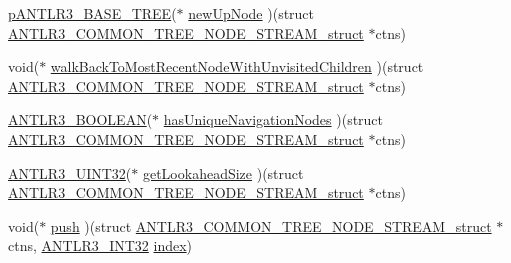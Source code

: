 \begin{DoxyCompactItemize}
\item 
\hyperlink{antlr3interfaces_8h_a6313a8a3e8f044398a393bd10c083852}{p\-A\-N\-T\-L\-R3\-\_\-\-B\-A\-S\-E\-\_\-\-T\-R\-E\-E}($\ast$ \hyperlink{struct_a_n_t_l_r3___c_o_m_m_o_n___t_r_e_e___n_o_d_e___s_t_r_e_a_m__struct_adf1b9363e749efdaca9c3548fbefda77}{new\-Up\-Node} )(struct \hyperlink{struct_a_n_t_l_r3___c_o_m_m_o_n___t_r_e_e___n_o_d_e___s_t_r_e_a_m__struct}{A\-N\-T\-L\-R3\-\_\-\-C\-O\-M\-M\-O\-N\-\_\-\-T\-R\-E\-E\-\_\-\-N\-O\-D\-E\-\_\-\-S\-T\-R\-E\-A\-M\-\_\-struct} $\ast$ctns)
\item 
void($\ast$ \hyperlink{struct_a_n_t_l_r3___c_o_m_m_o_n___t_r_e_e___n_o_d_e___s_t_r_e_a_m__struct_a42b7aaeffe7b8cd39db1a34631892db2}{walk\-Back\-To\-Most\-Recent\-Node\-With\-Unvisited\-Children} )(struct \hyperlink{struct_a_n_t_l_r3___c_o_m_m_o_n___t_r_e_e___n_o_d_e___s_t_r_e_a_m__struct}{A\-N\-T\-L\-R3\-\_\-\-C\-O\-M\-M\-O\-N\-\_\-\-T\-R\-E\-E\-\_\-\-N\-O\-D\-E\-\_\-\-S\-T\-R\-E\-A\-M\-\_\-struct} $\ast$ctns)
\item 
\hyperlink{antlr3defs_8h_a5b33dccbba3b7212539695e21df4079b}{A\-N\-T\-L\-R3\-\_\-\-B\-O\-O\-L\-E\-A\-N}($\ast$ \hyperlink{struct_a_n_t_l_r3___c_o_m_m_o_n___t_r_e_e___n_o_d_e___s_t_r_e_a_m__struct_aba4407a97b5b813424917502c145d969}{has\-Unique\-Navigation\-Nodes} )(struct \hyperlink{struct_a_n_t_l_r3___c_o_m_m_o_n___t_r_e_e___n_o_d_e___s_t_r_e_a_m__struct}{A\-N\-T\-L\-R3\-\_\-\-C\-O\-M\-M\-O\-N\-\_\-\-T\-R\-E\-E\-\_\-\-N\-O\-D\-E\-\_\-\-S\-T\-R\-E\-A\-M\-\_\-struct} $\ast$ctns)
\item 
\hyperlink{antlr3defs_8h_ac41f744abd0fd25144b9eb9d11b1dfd1}{A\-N\-T\-L\-R3\-\_\-\-U\-I\-N\-T32}($\ast$ \hyperlink{struct_a_n_t_l_r3___c_o_m_m_o_n___t_r_e_e___n_o_d_e___s_t_r_e_a_m__struct_a9dd9469234c2fd260b1db84cde10dcbe}{get\-Lookahead\-Size} )(struct \hyperlink{struct_a_n_t_l_r3___c_o_m_m_o_n___t_r_e_e___n_o_d_e___s_t_r_e_a_m__struct}{A\-N\-T\-L\-R3\-\_\-\-C\-O\-M\-M\-O\-N\-\_\-\-T\-R\-E\-E\-\_\-\-N\-O\-D\-E\-\_\-\-S\-T\-R\-E\-A\-M\-\_\-struct} $\ast$ctns)
\item 
void($\ast$ \hyperlink{struct_a_n_t_l_r3___c_o_m_m_o_n___t_r_e_e___n_o_d_e___s_t_r_e_a_m__struct_afb33dc7b9cf2ade6cccc744bb26855bd}{push} )(struct \hyperlink{struct_a_n_t_l_r3___c_o_m_m_o_n___t_r_e_e___n_o_d_e___s_t_r_e_a_m__struct}{A\-N\-T\-L\-R3\-\_\-\-C\-O\-M\-M\-O\-N\-\_\-\-T\-R\-E\-E\-\_\-\-N\-O\-D\-E\-\_\-\-S\-T\-R\-E\-A\-M\-\_\-struct} $\ast$ctns, \hyperlink{antlr3defs_8h_a6faef5c4687f8eb633d2aefea93973ca}{A\-N\-T\-L\-R3\-\_\-\-I\-N\-T32} \hyperlink{xyz2cfg_8m_ab8735b00764542f758cab8113c52b8ec}{index})
\item 

\end{DoxyCompactItemize}
